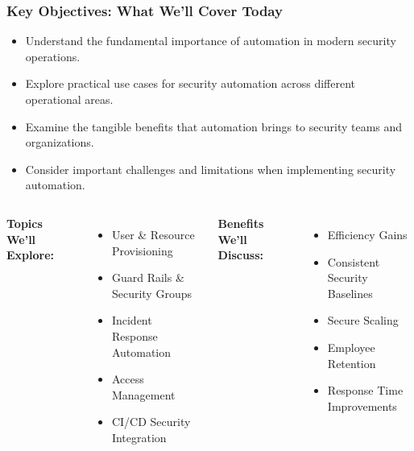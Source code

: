 \documentclass{beamer}
\begin{document}
\begin{frame}
  \frametitle{Key Objectives: What We'll Cover Today}
  
  \begin{itemize}
    \item Understand the fundamental importance of automation in modern security operations.
    \item Explore practical use cases for security automation across different operational areas.
    \item Examine the tangible benefits that automation brings to security teams and organizations.
    \item Consider important challenges and limitations when implementing security automation.
  \end{itemize}
  
  \begin{columns}[t]
    \textbf{Topics We'll Explore:}
    \begin{itemize}
      \item User \& Resource Provisioning
      \item Guard Rails \& Security Groups
      \item Incident Response Automation
      \item Access Management
      \item CI/CD Security Integration
    \end{itemize}
    
    \textbf{Benefits We'll Discuss:}
    \begin{itemize}
      \item Efficiency Gains
      \item Consistent Security Baselines
      \item Secure Scaling
      \item Employee Retention
      \item Response Time Improvements
    \end{itemize}
  \end{columns}
\end{frame}
\end{document}
